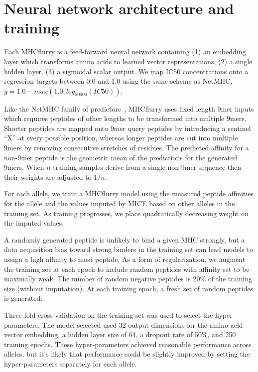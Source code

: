 \section{Neural network architecture and training}
Each MHCflurry is a feed-forward neural network containing (1) an embedding layer which transforms amino acids to learned vector representations, (2) a single hidden layer, (3) a sigmoidal scalar output. We map IC50 concentrations onto a regression targets between 0.0 and 1.0 using the same scheme as NetMHC, $y = 1.0 - max(1.0, log_{50000}(IC50))$.


Like the NetMHC family of predictors~\cite{lundegaard2008accurate}, MHCflurry uses fixed length 9mer inputs which requires peptides of other lengths to be transformed into multiple 9mers. Shorter peptides are mapped onto 9mer query peptides by introducing a sentinel ``X'' at every possible position, whereas longer peptides are cut into multiple 9mers by removing consecutive stretches of residues. The predicted affinity for a non-9mer peptide is the geometric mean of the predictions for the generated 9mers. When $n$ training samples derive from a single non-9mer sequence then their weights are adjusted to $1/n$. 

For each allele, we train a MHCflurry model using the measured peptide affinities for the allele and the values imputed by MICE based on other alleles in the training set. As training progresses, we place quadratically decreasing weight on the imputed values.

A randomly generated peptide is unlikely to bind a given MHC strongly, but a data acquisition bias toward strong binders in the training set can lead models to assign a high affinity to most peptide. As a form of regularization, we augment the training set at each epoch to include random peptides with affinity set to be maximally weak. The number of random negative peptides is 20\% of the training size (without imputation). At each training epoch, a fresh set of random peptides is generated.

Three-fold cross validation on the training set was used to select the hyper-parameters. The model selected used 32 output dimensions for the amino acid vector embedding, a hidden layer size of 64, a dropout rate\cite{Srivastava2014} of 50\%, and 250 training epochs. These hyper-parameters achieved reasonable performance across alleles, but it's likely that performance could be slightly improved by setting the hyper-parameters separately for each allele.